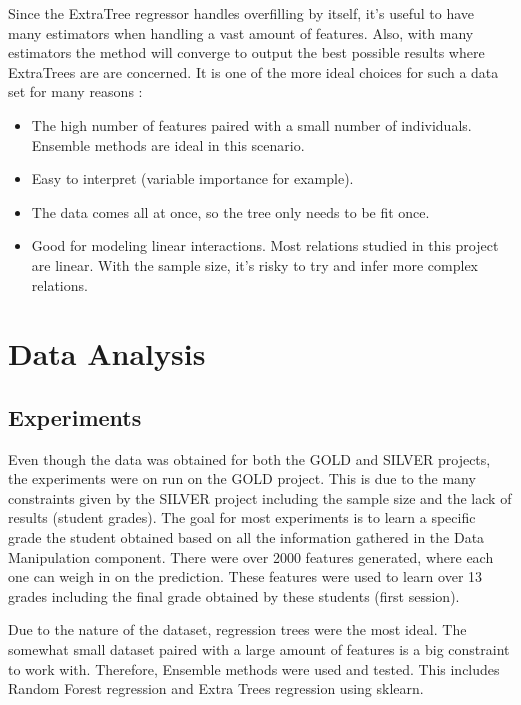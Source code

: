 \documentclass[a4paper,11pt]{report}
\numberwithin{figure}{section} %
\begin{document}
    Since the ExtraTree regressor handles overfilling by itself, it's useful to have many estimators when handling a vast amount of features.
    Also, with many estimators the method will converge to output the best possible results where ExtraTrees are are concerned.
    It is one of the more ideal choices for such a data set for many reasons :
    \begin{itemize}
        \item[\textbullet] The high number of features paired with a small number of individuals.
        Ensemble methods are ideal in this scenario.
        \item[\textbullet] Easy to interpret (variable importance for example).
        \item[\textbullet] The data comes all at once, so the tree only needs to be fit once.
        \item[\textbullet] Good for modeling linear interactions.
        Most relations studied in this project are linear.
        With the sample size, it's risky to try and infer more complex relations.
    \end{itemize}

\chapter{Data Analysis}

	\section{Experiments} \label{experiments}


    Even though the data was obtained for both the GOLD and SILVER projects, the experiments were on run on the GOLD project.
    This is due to the many constraints given by the SILVER project including the sample size and the lack of results (student grades).
    The goal for most experiments is to learn a specific grade the student obtained based on all the information gathered in the Data Manipulation component.
    There were over 2000 features generated, where each one can weigh in on the prediction.
    These features were used to learn over 13 grades including the final grade obtained by these students (first session).\newline


    Due to the nature of the dataset, regression trees were the most ideal.
    The somewhat small dataset paired with a large amount of features is a big constraint to work with.
    Therefore, Ensemble methods were used and tested.
    This includes Random Forest regression and Extra Trees regression using sklearn.\newline
\end{document}
